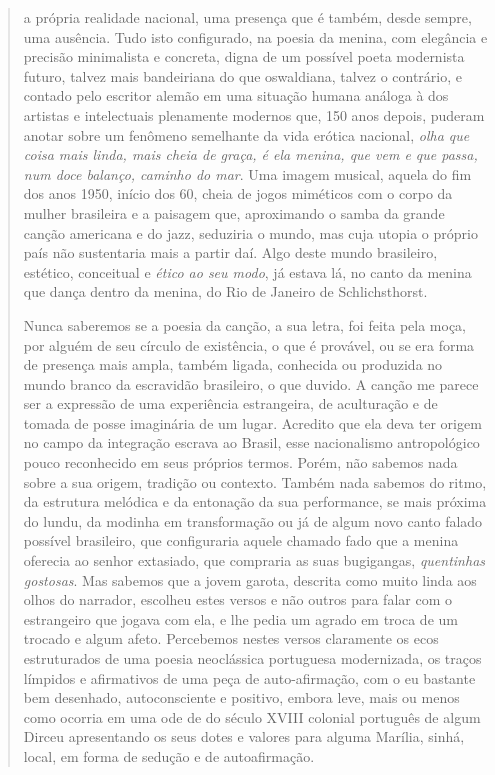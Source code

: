 \begin{quote}
a própria realidade nacional, uma presença que é também, desde sempre,
uma ausência. Tudo isto configurado, na poesia da menina, com elegância
e precisão minimalista e concreta, digna de um possível poeta modernista
futuro, talvez mais bandeiriana do que oswaldiana, talvez o contrário, e
contado pelo escritor alemão em uma situação humana análoga à dos
artistas e intelectuais plenamente modernos que, 150 anos depois,
puderam anotar sobre um fenômeno semelhante da vida erótica nacional,
\emph{olha que coisa mais linda, mais cheia de graça, é ela menina, que
vem e que passa, num doce balanço, caminho do mar}. Uma imagem musical,
aquela do fim dos anos 1950, início dos 60, cheia de jogos miméticos com
o corpo da mulher brasileira e a paisagem que, aproximando o samba da
grande canção americana e do jazz, seduziria o mundo, mas cuja utopia o
próprio país não sustentaria mais a partir daí. Algo deste mundo
brasileiro, estético, conceitual e \emph{ético ao seu modo}, já estava
lá, no canto da menina que dança dentro da menina, do Rio de Janeiro de
Schlichsthorst.

Nunca saberemos se a poesia da canção, a sua letra, foi feita pela moça,
por alguém de seu círculo de existência, o que é provável, ou se era
forma de presença mais ampla, também ligada, conhecida ou produzida no
mundo branco da escravidão brasileiro, o que duvido. A canção me parece
ser a expressão de uma experiência estrangeira, de aculturação e de
tomada de posse imaginária de um lugar. Acredito que ela deva ter origem
no campo da integração escrava ao Brasil, esse nacionalismo
antropológico pouco reconhecido em seus próprios termos. Porém, não
sabemos nada sobre a sua origem, tradição ou contexto. Também nada
sabemos do ritmo, da estrutura melódica e da entonação da sua
performance, se mais próxima do lundu, da modinha em transformação ou já
de algum novo canto falado possível brasileiro, que configuraria aquele
chamado fado que a menina oferecia ao senhor extasiado, que compraria as
suas bugigangas, \emph{quentinhas gostosas}. Mas sabemos que a jovem
garota, descrita como muito linda aos olhos do narrador, escolheu estes
versos e não outros para falar com o estrangeiro que jogava com ela, e
lhe pedia um agrado em troca de um trocado e algum afeto. Percebemos
nestes versos claramente os ecos estruturados de uma poesia neoclássica
portuguesa modernizada, os traços límpidos e afirmativos de uma peça de
auto-afirmação, com o eu bastante bem desenhado, autoconsciente e
positivo, embora leve, mais ou menos como ocorria em uma ode de do
século XVIII colonial português de algum Dirceu apresentando os seus
dotes e valores para alguma Marília, sinhá, local, em forma de sedução e
de autoafirmação.


\end{quote}
